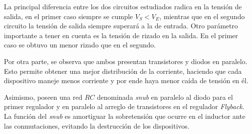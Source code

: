 La principal diferencia entre los dos circuitos estudiados radica en la tensión de salida, en el primer caso siempre se cumple $V_S < V_E$, mientras que en el segundo circuito la tensión de salida siempre superará a la de entrada.
Otro parámetro importante a tener en cuenta es la tensión de rizado en la salida. En el primer caso se obtuvo un menor rizado que en el segundo. 

Por otra parte, se observa que ambos presentan transistores y diodos en paralelo. Esto permite obtener una mejor distribución de la corriente, haciendo que cada dispositivo maneje menos corriente y por ende haya menor caída de tensión en él.

Asimismo, poseen una red $RC$ denominada \textit{snub} en paralelo al diodo para el primer regulador y en paralelo al arreglo de transistores en el regulador \textit{Flyback}. La función del \textit{snub} es amortiguar la sobretensión que ocurre en el inductor ante las conmutaciones, evitando la destrucción de los dispositivos.



